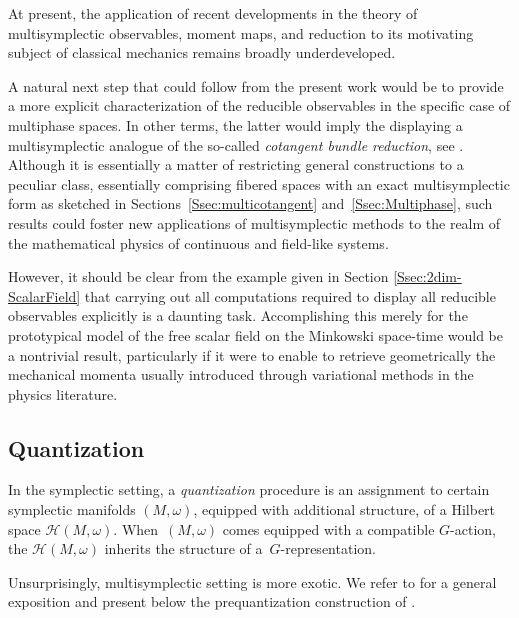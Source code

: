\documentclass[pdftex]{sigma}
\numberwithin{equation}{section}
\begin{document}
At present, the application of recent developments in the theory of multisymplectic observables, moment maps, and reduction to its motivating subject of classical mechanics remains broadly underdeveloped.

A natural next step that could follow from the present work would be to provide a more explicit characterization of the reducible observables in the specific case of multiphase spaces.
In other terms, the latter would imply the displaying a multisymplectic analogue of the so-called \emph{cotangent bundle reduction}, see \cite{MarsdenMisiolekOrtegaPerlmutterRatiu07,OrtegaRatiu06}.
Although it is essentially a matter of restricting general constructions to a peculiar class, essentially comprising fibered spaces with an exact multisymplectic form as sketched in Sections~\ref{Ssec:multicotangent} and~\ref{Ssec:Multiphase}, such results could foster new applications of multisymplectic methods to the realm of the mathematical physics of continuous and field-like systems.

However, it should be clear from the example given in Section \ref{Ssec:2dim-ScalarField} that carrying out all computations required to display all reducible observables explicitly is a daunting task.
Accomplishing this merely for the prototypical model of the free scalar field on the Minkowski space-time would be a nontrivial result, particularly if it were to enable to retrieve geometrically the mechanical momenta usually introduced through variational methods in the physics literature.


\subsection{Quantization}

In the symplectic setting, a \emph{quantization} procedure is an assignment to certain symplectic manifolds $(M,\omega)$, equipped with additional structure, of a Hilbert space $\mathcal{H}(M,\omega)$. When~$(M,\omega)$ comes equipped with a compatible $G$-action, the $\mathcal{H}(M,\omega)$ inherits the structure of a~$G$-repre\-sentation.

Unsurprisingly, multisymplectic setting is more exotic. We refer to \cite{Schreiber21} for a general exposition and present below the prequantization construction of \cite{FiorenzaRogersSchreiber14,FiorenzaRogersSchreiber16}.
\end{document}
